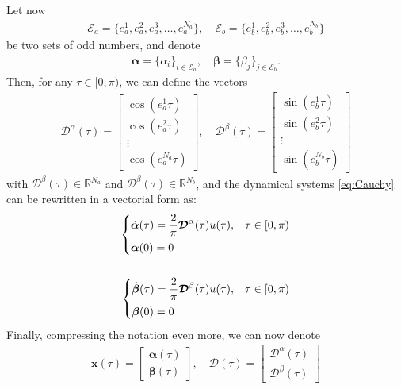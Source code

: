 Let now
\begin{align*}
	\mathcal{E}_a = \{e_a^1,e_a^2,e_a^3,\dots,e_a^{N_a}\}, \quad \mathcal{E}_b = \{e_b^1,e_b^2,e_b^3,\dots,e_b^{N_b}\}    
\end{align*}
be two sets of odd numbers, and denote
\begin{align*}
	\bm{\alpha} = \{\alpha_i\}_{i\in\mathcal{E}_a}, \quad \bm{\beta} = \{\beta_j\}_{j\in\mathcal{E}_b}.
\end{align*}
Then, for any $\tau\in [0,\pi)$, we can define the vectors 
\begin{align*}
	\bm{\mathcal{D}}^\alpha(\tau) = 
	\begin{bmatrix} 
		\cos(e_a^1\tau) \\ \cos(e_a^2\tau) \\ \vdots \\ \cos(e_a^{N_a}\tau) 
	\end{bmatrix},
	\quad \bm{\mathcal{D}}^\beta(\tau) = 
	\begin{bmatrix} 
		\sin(e_b^1\tau) \\ \sin(e_b^2\tau) \\ \vdots \\ \sin(e_b^{N_b}\tau) 
	\end{bmatrix} 
\end{align*}
with $\bm{\mathcal{D}}^\beta(\tau) \in \mathbb{R}^{N_a} $ and $ \bm{\mathcal{D}}^\beta(\tau) \in \mathbb{R}^{N_b}$, and the dynamical systems \eqref{eq:Cauchy} can be rewritten in a vectorial form as:
\begin{align}\label{eq:CauchyVec}
	\begin{cases}
		\displaystyle \dot{\bm{\alpha}}(\tau) = \frac 2\pi \bm{\mathcal{D}}^\alpha(\tau) u(\tau), & \tau \in [0,\pi)
		\\[6pt]
		\bm{\alpha}(0) = 0
	\end{cases} \notag
	\\
	\\
	\begin{cases}
		\displaystyle\dot{\bm{\beta}}(\tau)  = \frac 2\pi \bm{\mathcal{D}}^\beta(\tau) u(\tau), & \tau \in [0,\pi) 
		\\[6pt]
		\bm{\beta}(0) = 0
	\end{cases}\notag 
\end{align}
Finally, compressing the notation even more, we can now denote 
\begin{align*}
	\bm{x}(\tau) = \begin{bmatrix} \bm{\alpha}(\tau) \\ \bm{\beta}(\tau) \end{bmatrix}, \quad
	\bm{\mathcal{D}}(\tau) = \begin{bmatrix} \bm{\mathcal{D}}^\alpha(\tau) \\ \bm{\mathcal{D}}^\beta(\tau) \end{bmatrix}     
\end{align*}
